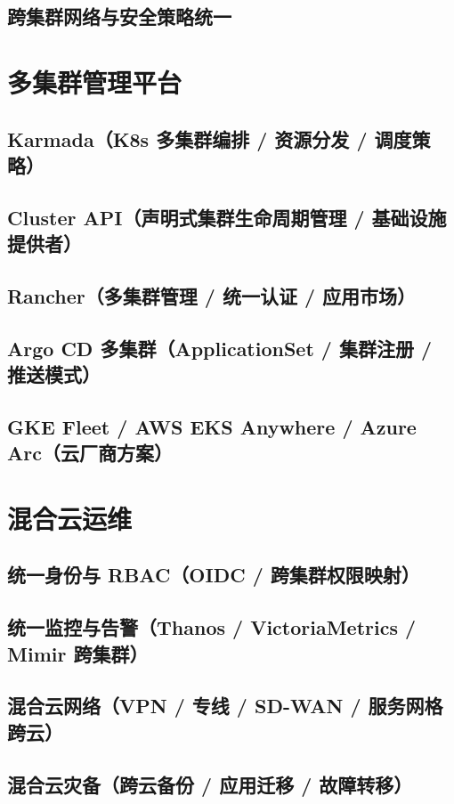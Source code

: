 \documentclass[12pt,UTF8]{ctexbook}
\begin{document}
    \subsection{跨集群网络与安全策略统一}

  \section{多集群管理平台}
    \subsection{Karmada（K8s 多集群编排 / 资源分发 / 调度策略）}
    \subsection{Cluster API（声明式集群生命周期管理 / 基础设施提供者）}
    \subsection{Rancher（多集群管理 / 统一认证 / 应用市场）}
    \subsection{Argo CD 多集群（ApplicationSet / 集群注册 / 推送模式）}
    \subsection{GKE Fleet / AWS EKS Anywhere / Azure Arc（云厂商方案）}

  \section{混合云运维}
    \subsection{统一身份与 RBAC（OIDC / 跨集群权限映射）}
    \subsection{统一监控与告警（Thanos / VictoriaMetrics / Mimir 跨集群）}
    \subsection{混合云网络（VPN / 专线 / SD-WAN / 服务网格跨云）}
    \subsection{混合云灾备（跨云备份 / 应用迁移 / 故障转移）}
\end{document}
